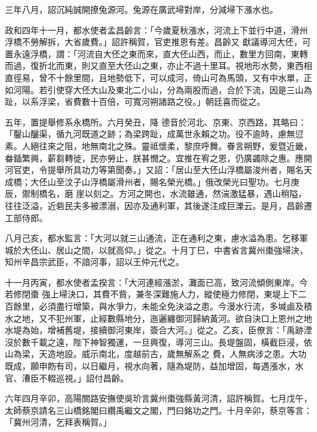\begin{pinyinscope}
 三年八月，詔沉純誠開撩兔源河。兔源在廣武埽對岸，分減埽下漲水也。



 政和四年十一月，都水使者孟昌齡言：「今歲夏秋漲水，河流上下並行中道，滑州浮橋不勞解拆，大省歲費。」詔許稱賀，官吏推恩有差。昌齡又
 獻議導河大伾，可置永遠浮橋，謂：「河流自大伾之東而來，直大伾山西，而止，數里方回南，東轉而過，復折北而東，則又直至大伾山之東，亦止不過十里耳。視地形水勢，東西相直徑易，曾不十餘里間，且地勢低下，可以成河，倚山可為馬頭，又有中水單，正如河陽。若引使穿大伾大山及東北二小山，分為兩股而過，合於下流，因是三山為趾，以系浮梁，省費數十百倍，可寬河朔諸路之役。」朝廷喜而從之。



 五年，置提舉修系永橋所。六月癸丑，降
 德音於河北、京東、京西路，其略曰：「鑿山釃渠，循九河既道之跡；為梁跨趾，成萬世永賴之功。役不逾時，慮無愆素。人絕往來之阻，地無南北之殊。靈祗懷柔，黎庶呼舞。眷言朔野，爰暨近畿，畚鍤繁興，薪芻轉徙，民亦勞止，朕甚憫之。宜推在宥之恩，仍廣蠲除之惠。應開河官吏，令提舉所具功力等第聞奏。」又詔：「居山至大伾山浮橋屬浚州者，賜名天成橋；大伾山至汶子山浮橋屬滑州者，賜名榮光橋。」俄改榮光曰聖功。七月庚辰，禦制橋名，磨
 崖以刻之。方河之開也，水流雖通，然湍激猛暴，遇山稍隘，往往泛溢，近砦民夫多被漂溺，因亦及通利軍，其後遂注成巨濼云。是月，昌齡遷工部侍郎。



 八月己亥，都水監言：「大河以就三山通流，正在通利之東，慮水溢為患。乞移軍城於大伾山、居山之間，以就高仰。」從之。十月丁巳，中書省言冀州棗強埽決，知州辛昌宗武臣，不諳河事，詔以王仲元代之。



 十一月丙寅，都水使者孟揆言：「大河連經漲淤，灘面已高，致河流傾側東岸。今若修閉棗
 強上埽決口，其費不貲，兼冬深難施人力，縱使極力修閉，東堤上下二百餘里，必須盡行增築，與水爭力，未能全免決溢之患。今漫水行流，多堿鹵及積水之地，又不犯州軍，止經數縣地分，迤邐纏御河歸納黃河。欲自決口上恩州之地水堤為始，增補舊堤，接續御河東岸，簽合大河。」從之。乙亥，臣僚言：「禹跡湮沒於數千載之遠，陛下神智獨運，一旦興復，導河三山。長堤盤固，橫截巨浸，依山為梁，天造地設。威示南北，度越前古，歲無解系之
 費，人無病涉之患。大功既成，願申飭有司，以日繼月，視水向著，隨為堤防，益加增固，每遇漲水，水官、漕臣不輟巡視。」詔付昌齡。



 六年四月辛卯，高陽關路安撫使吳玠言冀州棗強縣黃河清，詔許稱賀。七月戊午，太師蔡京請名三山橋銘閣曰纘禹繼文之閣，門曰銘功之門。十月辛卯，蔡京等言：「冀州河清，乞拜表稱賀。」




\end{pinyinscope}
